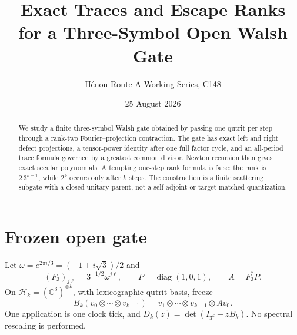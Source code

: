 \documentclass[10pt]{article}
\title{Exact Traces and Escape Ranks\\for a Three-Symbol Open Walsh Gate}
\author{H\'enon Route-A Working Series, C148}
\date{25 August 2026}
\begin{document}
\maketitle
\vspace{-1.5em}
\begin{abstract}
We study a finite three-symbol Walsh gate obtained by passing one qutrit per
step through a rank-two Fourier--projection contraction.  The gate has exact
left and right defect projections, a tensor-power identity after one full
factor cycle, and an all-period trace formula governed by a greatest common
divisor.  Newton recursion then gives exact secular polynomials.  A tempting
one-step rank formula is false: the rank is $2\,3^{k-1}$, while $2^k$ occurs
only after $k$ steps.  The construction is a finite scattering subgate with a
closed unitary parent, not a self-adjoint or target-matched quantization.
\end{abstract}

\section{Frozen open gate}
Let $\omega=e^{2\pi i/3}=(-1+i\sqrt3)/2$ and
\[
 (F_3)_{j\ell}=3^{-1/2}\omega^{j\ell},\qquad
 P=\operatorname{diag}(1,0,1),\qquad A=F_3^*P.
\]
On $\mathcal H_k=(\mathbb C^3)^{\otimes k}$, with lexicographic qutrit
basis, freeze
\begin{equation}
 B_k(v_0\otimes\cdots\otimes v_{k-1})
 =v_1\otimes\cdots\otimes v_{k-1}\otimes Av_0.       \tag{1}
\end{equation}
One application is one clock tick, and
$D_k(z)=\det(I_{3^k}-zB_k)$.  No spectral rescaling is performed.
\end{document}
